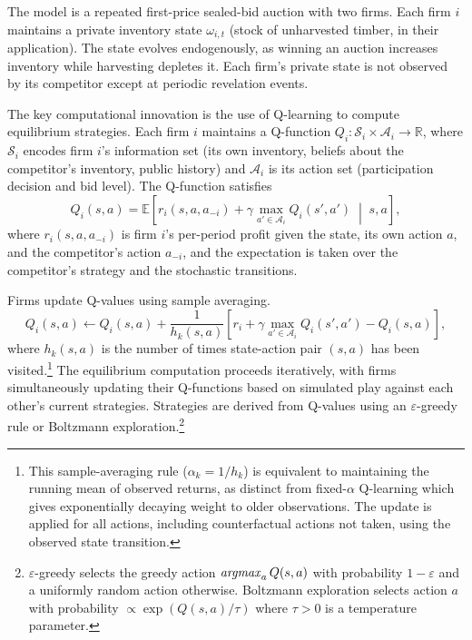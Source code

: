 The model is a repeated first-price sealed-bid auction with two firms. Each firm $i$ maintains a private inventory state $\omega_{i,t}$ (stock of unharvested timber, in their application). The state evolves endogenously, as winning an auction increases inventory while harvesting depletes it. Each firm's private state is not observed by its competitor except at periodic revelation events.

The key computational innovation is the use of Q-learning to compute equilibrium strategies. Each firm $i$ maintains a Q-function $Q_i: \mathcal{S}_i \times \mathcal{A}_i \to \mathbb{R}$, where $\mathcal{S}_i$ encodes firm $i$'s information set (its own inventory, beliefs about the competitor's inventory, public history) and $\mathcal{A}_i$ is its action set (participation decision and bid level). The Q-function satisfies
\begin{equation}
Q_i(s, a) = \mathbb{E}\left[r_i(s, a, a_{-i}) + \gamma \max_{a' \in \mathcal{A}_i} Q_i(s', a') \;\middle|\; s, a\right], \label{eq:asker_bellman}
\end{equation}
where $r_i(s, a, a_{-i})$ is firm $i$'s per-period profit given the state, its own action $a$, and the competitor's action $a_{-i}$, and the expectation is taken over the competitor's strategy and the stochastic transitions.

Firms update Q-values using sample averaging.
\begin{equation}
Q_i(s, a) \leftarrow Q_i(s, a) + \frac{1}{h_k(s,a)}\left[r_i + \gamma \max_{a' \in \mathcal{A}_i} Q_i(s', a') - Q_i(s, a)\right], \label{eq:asker_qupdate}
\end{equation}
where $h_k(s,a)$ is the number of times state-action pair $(s,a)$ has been visited.\footnote{This sample-averaging rule ($\alpha_k = 1/h_k$) is equivalent to maintaining the running mean of observed returns, as distinct from fixed-$\alpha$ Q-learning which gives exponentially decaying weight to older observations. The update is applied for all actions, including counterfactual actions not taken, using the observed state transition.} The equilibrium computation proceeds iteratively, with firms simultaneously updating their Q-functions based on simulated play against each other's current strategies. Strategies are derived from Q-values using an $\varepsilon$-greedy rule or Boltzmann exploration.\footnote{$\varepsilon$-greedy selects the greedy action $\mathop{\it argmax}_a Q(s,a)$ with probability $1-\varepsilon$ and a uniformly random action otherwise. Boltzmann exploration selects action $a$ with probability $\propto \exp(Q(s,a)/\tau)$ where $\tau > 0$ is a temperature parameter.}

